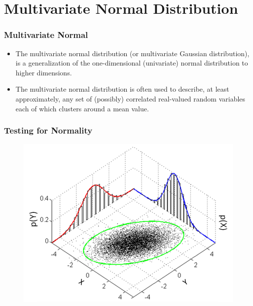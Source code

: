 \documentclass{beamer}
\begin{document}
	\section{Multivariate Normal Distribution}
	
\begin{frame}[fragile]
	\frametitle{Multivariate Normal}
	{\Large
		\begin{itemize}
			\item The multivariate normal distribution (or multivariate Gaussian distribution), is a generalization of the one-dimensional (univariate) normal distribution to higher dimensions.
			\item The multivariate normal distribution is often used to describe, at least approximately, any set of (possibly) correlated real-valued random variables each of which clusters around a mean value.
		\end{itemize}
	}
\end{frame}
\begin{frame}[fragile]
\frametitle{Testing for Normality}
	
\begin{figure}[h!]
\centering
\includegraphics[width=0.95\linewidth]{./793px-MultivariateNormal}
\end{figure}
	
\end{frame}
\end{document}
